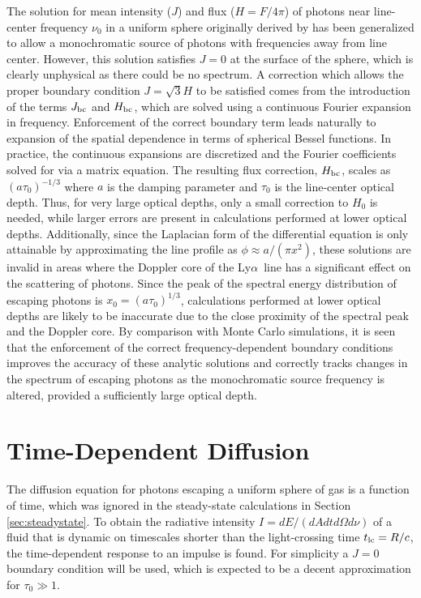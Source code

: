 \documentclass{aastex63}
\newcommand\lya{Ly$\alpha$\ }
\begin{document}
The solution for mean intensity ($J$) and flux ($H = F/4\pi$) of photons near line-center frequency $\nu_0$ in a uniform sphere originally derived by \cite{2006ApJ...649...14D} has been generalized to allow a monochromatic source of photons with frequencies away from line center. However, this solution satisfies $J=0$ at the surface of the sphere, which is clearly unphysical as there could be no spectrum. A correction which allows the proper boundary condition $J=\sqrt{3}H$ to be satisfied comes from the introduction of the terms $J_{\rm bc}$ and $H_{\rm bc}$, which are solved using a continuous Fourier expansion in frequency. Enforcement of the correct boundary term leads naturally to expansion of the spatial dependence in terms of spherical Bessel functions. In practice, the continuous expansions are discretized and the Fourier coefficients solved for via a matrix equation. The resulting flux correction, $H_{\rm bc}$, scales as $(a\tau_0)^{-1/3}$ where $a$ is the damping parameter and $\tau_0$ is the line-center optical depth. Thus, for very large optical depths, only a small correction to $H_0$ is needed, while larger errors are present in calculations performed at lower optical depths. Additionally, since the Laplacian form of the differential equation is only attainable by approximating the line profile as $\phi \approx a/(\pi x^2)$, these solutions are invalid in areas where the Doppler core of the \lya line has a significant effect on the scattering of photons. Since the peak of the spectral energy distribution of escaping photons is $x_0 = (a\tau_0)^{1/3}$, calculations performed at lower optical depths are likely to be inaccurate due to the close proximity of the spectral peak and the Doppler core. By comparison with Monte Carlo simulations, it is seen that the enforcement of the correct frequency-dependent boundary conditions improves the accuracy of these analytic solutions and correctly tracks changes in the spectrum of escaping photons as the monochromatic source frequency is altered, provided a sufficiently large optical depth.

\section{Time-Dependent Diffusion}
\label{sec:time_dependent}

The diffusion equation for photons escaping a uniform sphere of gas is a function of time, which was ignored in the steady-state calculations in Section \ref{sec:steadystate}. To obtain the radiative intensity $I=dE/(dAdtd\Omega d\nu)$ of a fluid that is dynamic on timescales shorter than the light-crossing time $t_{\rm lc} = R/c$, the time-dependent response to an impulse is found. For simplicity a $J=0$ boundary condition will be used, which is expected to be a decent approximation for $\tau_0 \gg 1$. 
\end{document}
